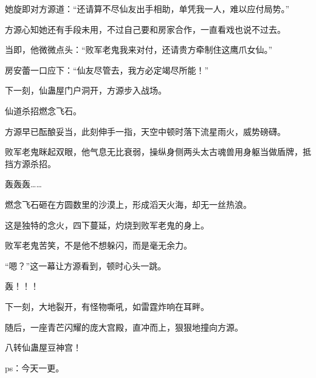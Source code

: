 \begin{this_body}
她旋即对方源道：“还请算不尽仙友出手相助，单凭我一人，难以应付局势。”

方源心知她还有手段未用，不过自己要和房家合作，一直看戏也说不过去。

当即，他微微点头：“败军老鬼我来对付，还请贵方牵制住这鹰爪女仙。”

房安蕾一口应下：“仙友尽管去，我方必定竭尽所能！”

下一刻，仙蛊屋门户洞开，方源步入战场。

仙道杀招燃念飞石。

方源早已酝酿妥当，此刻伸手一指，天空中顿时落下流星雨火，威势磅礴。

败军老鬼眯起双眼，他气息无比衰弱，操纵身侧两头太古魂兽用身躯当做盾牌，抵挡方源杀招。

轰轰轰……

燃念飞石砸在方圆数里的沙漠上，形成滔天火海，却无一丝热浪。

这是独特的念火，四下蔓延，灼烧到败军老鬼的身上。

败军老鬼苦笑，不是他不想躲闪，而是毫无余力。

“嗯？”这一幕让方源看到，顿时心头一跳。

轰！！！

下一刻，大地裂开，有怪物嘶吼，如雷霆炸响在耳畔。

随后，一座青芒闪耀的庞大宫殿，直冲而上，狠狠地撞向方源。

八转仙蛊屋豆神宫！

ps：今天一更。

\end{this_body}

